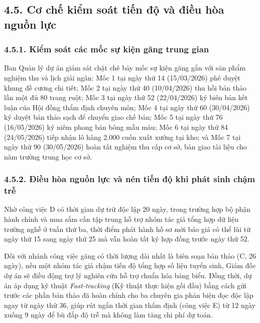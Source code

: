 \subsection*{4.5. Cơ chế kiểm soát tiến độ và điều hòa nguồn lực}

\subsubsection*{4.5.1. Kiểm soát các mốc sự kiện găng trung gian}

Ban Quản lý dự án giám sát chặt chẽ bảy mốc sự kiện găng gắn với sản phẩm nghiệm thu và lịch giải ngân: Mốc 1 tại ngày thứ 14 (15/03/2026) phê duyệt khung đề cương chi tiết; Mốc 2 tại ngày thứ 40 (10/04/2026) thu hồi bản thảo lần một đủ 80 trang ruột; Mốc 3 tại ngày thứ 52 (22/04/2026) ký biên bản kết luận của Hội đồng thẩm định chuyên môn; Mốc 4 tại ngày thứ 60 (30/04/2026) ký duyệt bản thảo sạch để chuyển giao chế bản; Mốc 5 tại ngày thứ 76 (16/05/2026) ký niêm phong bản bông mẫu màu; Mốc 6 tại ngày thứ 84 (24/05/2026) tiếp nhận lô hàng 2.000 cuốn xuất xưởng tại kho; và Mốc 7 tại ngày thứ 90 (30/05/2026) hoàn tất nghiệm thu cấp cơ sở, bàn giao tài liệu cho năm trường trung học cơ sở.

\subsubsection*{4.5.2. Điều hòa nguồn lực và nén tiến độ khi phát sinh chậm trễ}

Nhờ công việc D có thời gian dự trữ độc lập 20 ngày, trong trường hợp bộ phận hành chính và mua sắm cần tập trung hỗ trợ nhóm tác giả tổng hợp dữ liệu trường nghề ở tuần thứ ba, thời điểm phát hành hồ sơ mời báo giá có thể lùi từ ngày thứ 15 sang ngày thứ 25 mà vẫn hoàn tất ký hợp đồng trước ngày thứ 52.

Đối với nhánh công việc găng có thời lượng dài nhất là biên soạn bản thảo (C, 26 ngày), nếu một nhóm tác giả chậm tiến độ tổng hợp số liệu tuyển sinh, Giám đốc dự án sẽ điều động trợ lý nghiên cứu hỗ trợ chuẩn hóa bảng biểu. Đồng thời, dự án áp dụng kỹ thuật \textit{Fast-tracking} (Kỹ thuật thực hiện gối đầu) bằng cách gửi trước các phần bản thảo đã hoàn chỉnh cho ba chuyên gia phản biện đọc độc lập ngay từ ngày thứ 36, giúp rút ngắn thời gian thẩm định (công việc E) từ 12 ngày xuống 9 ngày để bù đắp độ trễ mà không làm tăng chi phí dự toán.

